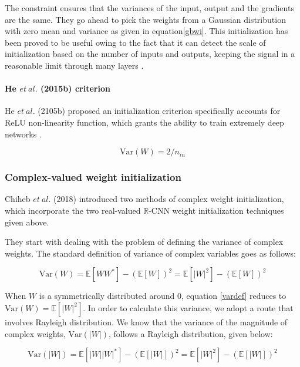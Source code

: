  The constraint ensures that the variances of the input, output and the gradients are the same. They go ahead to pick the weights from a Gaussian distribution with zero mean and variance as given in equation\ref{gbwi}. This initialization has been proved to be useful owing to the fact that it can detect the scale of initialization based on the number of inputs and outputs, keeping the signal in a reasonable limit through many layers \cite{recent_advances} \cite{glorot2010understanding}.
 
 
 \paragraph{He $et \ al.$ (2015b) criterion}
 He $et \ al.$ (2105b) proposed an initialization criterion specifically accounts for ReLU non-linearity function, which grants the ability to train extremely deep networks \cite{recent_advances} \cite{he2015delving}. 
 
 
 
 \begin{equation}\label{hewi}
 \mathrm{Var}(W) = 2/n_{in}
 \end{equation}
 \subsubsection{Complex-valued weight initialization}\label{cwi}
 Chiheb $et \ al.$ (2018) introduced two methods of complex weight initialization, which incorporate the two real-valued $\mathbb{R}$-CNN weight initialization techniques given above.
 
 They start with dealing with the problem of defining the variance of complex weights. The standard definition of variance of complex variables goes as follows:
 
 \begin{equation}\label{vardef}
 \mathrm{Var}(W) = \mathbb{E}[WW^{*}]-(\mathbb{E}[W])^2 = \mathbb{E}[|W|^{2}]-(\mathbb{E}[W])^2
 \end{equation}
 
 
 When $W$ is a symmetrically distributed around 0, equation \ref{vardef} reduces to $\mathrm{Var}(W) = \mathbb{E}[|W|^{2}]$. In order to calculate this variance, we adopt a route that involves Rayleigh distribution. We know that the variance of the magnitude of complex weights, $\mathrm{Var}(|W|)$, follows a Rayleigh distribution, given below:
 
 \begin{equation}\label{varmagrayleighdef}
 \mathrm{Var}(|W|) = \mathbb{E}[|W||W|^{*}]-(\mathbb{E}[|W|])^2 = \mathbb{E}[|W|^{2}]-(\mathbb{E}[|W|])^2
 \end{equation}
 
